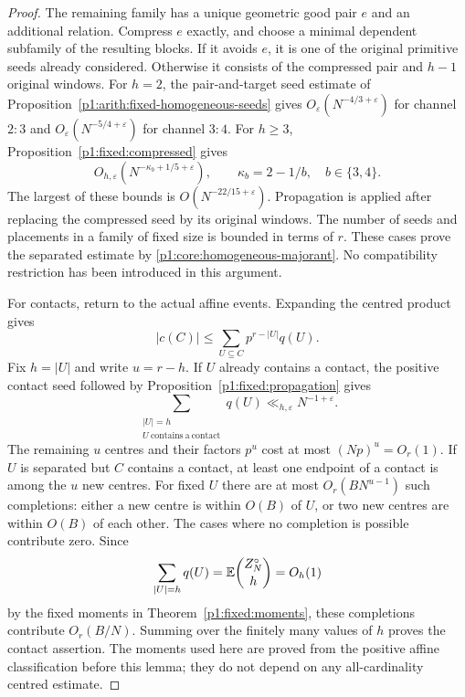 \begin{proof}
The remaining family has a unique geometric good pair $e$ and an
additional relation. Compress $e$ exactly, and choose a minimal dependent
subfamily of the resulting blocks. If it avoids $e$, it is one of the
original primitive seeds already considered. Otherwise it consists of
the compressed pair and $h-1$ original windows. For $h=2$, the
pair-and-target seed estimate of
Proposition~\ref{p1:arith:fixed-homogeneous-seeds} gives
$O_\varepsilon(N^{-4/3+\varepsilon})$ for channel $2:3$ and
$O_\varepsilon(N^{-5/4+\varepsilon})$ for channel $3:4$.
For $h\ge3$, Proposition~\ref{p1:fixed:compressed} gives
\[
 O_{h,\varepsilon}(N^{-\kappa_b+1/5+\varepsilon}),
 \qquad \kappa_b=2-1/b,\quad b\in\{3,4\}.
\]
The largest of these bounds is $O(N^{-22/15+\varepsilon})$.
Propagation is applied after replacing the compressed seed by its original
windows. The number of seeds and placements in a family of fixed size is
bounded in terms of $r$. These cases prove the separated estimate by
\eqref{p1:core:homogeneous-majorant}. No compatibility restriction has
been introduced in this argument.

For contacts, return to the actual affine events. Expanding the centred
product gives
\begin{equation}
 |c(C)|\le\sum_{U\subseteq C}p^{r-|U|}q(U).
 \label{p1:core:contact-expansion}
\end{equation}
Fix $h=|U|$ and write $u=r-h$. If $U$ already contains a contact,
the positive contact seed followed by
Proposition~\ref{p1:fixed:propagation} gives
\[
 \sum_{\substack{|U|=h\\U\ \mathrm{contains\ a\ contact}}}q(U)
       \ll_{h,\varepsilon}N^{-1+\varepsilon}.
\]
The remaining $u$ centres and their factors $p^u$ cost at most
$(Np)^u=O_r(1)$. If $U$ is separated but $C$ contains a contact,
at least one endpoint of a contact is among the $u$ new centres.
For fixed $U$ there are at most $O_r(BN^{u-1})$ such completions:
either a new centre is within $O(B)$ of $U$, or two new centres are
within $O(B)$ of each other. The cases where no completion is possible
contribute zero. Since
\[
 \sum_{|U|=h}q(U)
       =\mathbb E\binom{Z_N^\circ}{h}=O_h(1)
\]
by the fixed moments in Theorem~\ref{p1:fixed:moments}, these
completions contribute $O_r(B/N)$. Summing over the finitely many
values of $h$ proves the contact assertion. The moments used here are
proved from the positive affine classification before this lemma; they
do not depend on any all-cardinality centred estimate.
\end{proof}

